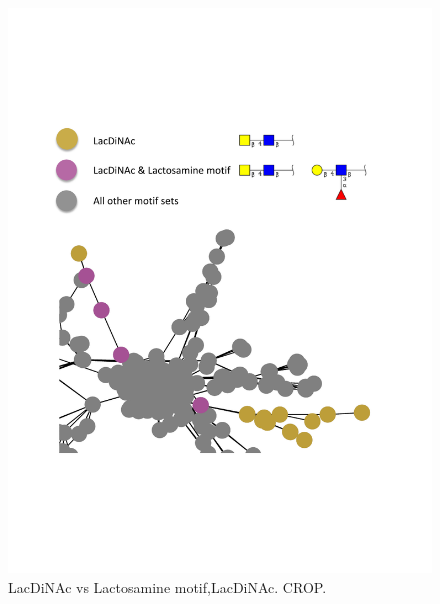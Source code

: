 \documentclass[12pt,a4paper]{article}
\begin{document}
\begin{figure}[H]
\centering 
\includegraphics[scale=0.7]{motif_similarity_exploration/LacDiNAc_vs_Lactosamine_motif_LacDiNAc.pdf} 
\caption{LacDiNAc vs Lactosamine motif,LacDiNAc. CROP.}
\label{fig:LacDiNAc_vs_Lactosamine motif,LacDiNAc}
\end{figure}
\end{document}
